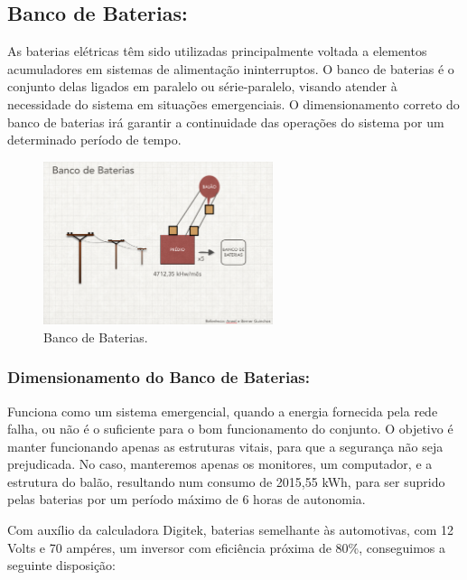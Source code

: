 \subsection{Banco de Baterias:}

As baterias elétricas têm sido utilizadas principalmente voltada a elementos acumuladores em sistemas de alimenta\c{c}ão ininterruptos. O banco de baterias é o conjunto delas ligados em paralelo ou série-paralelo, visando atender à necessidade do sistema em situações emergenciais. O dimensionamento correto do banco de baterias irá garantir a continuidade das operações do sistema por um determinado período de tempo.

\begin{figure}[H]
	\centering
	\includegraphics[width=0.6\textwidth]{figuras/baterias}
	\caption{Banco de Baterias.}
	\label{img:baterias}
\end{figure}

\subsubsection{Dimensionamento do Banco de Baterias:}

Funciona como um sistema emergencial, quando a energia fornecida pela rede falha, ou não é o suficiente para o bom funcionamento do conjunto. O objetivo é manter funcionando apenas as estruturas vitais, para que a segurança não seja prejudicada. No caso, manteremos apenas os monitores, um computador, e a estrutura do balão, resultando num consumo de 2015,55 kWh, para ser suprido pelas baterias por um período máximo de 6 horas de autonomia.

Com auxílio da calculadora Digitek, baterias semelhante às automotivas, com 12 Volts e 70 ampéres, um inversor com eficiência próxima de 80\%, conseguimos a seguinte disposição:

